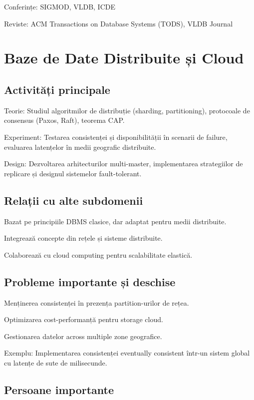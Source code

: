 \documentclass[12pt]{article}
\begin{document}
Conferințe: SIGMOD, VLDB, ICDE

Reviste: ACM Transactions on Database Systems (TODS), VLDB Journal

\section{Baze de Date Distribuite și Cloud}

\subsection*{Activități principale}

Teorie: Studiul algoritmilor de distribuție (sharding, partitioning), protocoale de consensus (Paxos, Raft), teorema CAP.

Experiment: Testarea consistenței și disponibilității în scenarii de failure, evaluarea latențelor în medii geografic distribuite.

Design: Dezvoltarea arhitecturilor multi-master, implementarea strategiilor de replicare și designul sistemelor fault-tolerant.

\subsection*{Relații cu alte subdomenii}

Bazat pe principiile DBMS clasice, dar adaptat pentru medii distribuite.

Integrează concepte din rețele și sisteme distribuite.

Colaborează cu cloud computing pentru scalabilitate elastică.

\subsection*{Probleme importante și deschise}

Menținerea consistenței în prezența partition-urilor de rețea.

Optimizarea cost-performanță pentru storage cloud.

Gestionarea datelor across multiple zone geografice.

Exemplu: Implementarea consistenței eventually consistent într-un sistem global cu latențe de sute de milisecunde.

\subsection*{Persoane importante}
\end{document}
